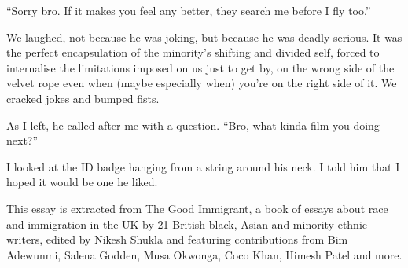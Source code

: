 \documentclass[10pt,a4paper]{article}
\begin{document}
“Sorry bro. If it makes you feel any better, they search me before I fly too.”

We laughed, not because he was joking, but because he was deadly serious. It was the perfect encapsulation of the minority’s shifting and divided self, forced to internalise the limitations imposed on us just to get by, on the wrong side of the velvet rope even when (maybe especially when) you’re on the right side of it. We cracked jokes and bumped fists.

As I left, he called after me with a question. “Bro, what kinda film you doing next?”

I looked at the ID badge hanging from a string around his neck. I told him that I hoped it would be one he liked.

This essay is extracted from The Good Immigrant, a book of essays about race and immigration in the UK by 21 British black, Asian and minority ethnic writers, edited by Nikesh Shukla and featuring contributions from Bim Adewunmi, Salena Godden, Musa Okwonga, Coco Khan, Himesh Patel and more.
\end{document}
